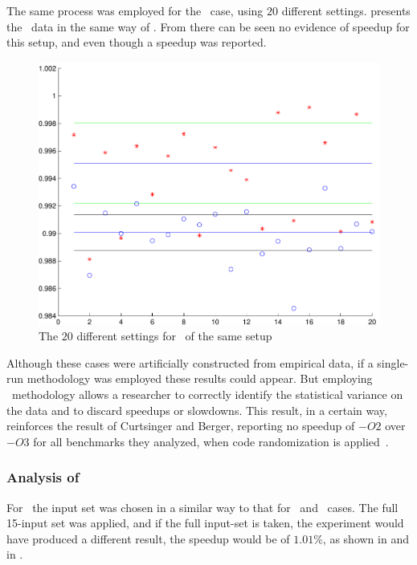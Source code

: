 The same process was employed for the \gzip\ case, using $20$ different settings.  presents the \gzip\ data in the same way of . From  there can be seen no evidence of speedup for this setup, and even though a speedup was reported.

\begin{figure}
  \centering
  \includegraphics[width=1.00\linewidth]{Figures/gzipfdll}
  \caption{The $20$ different settings for \gzip\ of the same setup}
  \label{fig:gzipfdll}
\end{figure}

Although these cases were artificially constructed from empirical data, if a single-run methodology was employed these results could appear. But employing \CP\ methodology allows a researcher to correctly identify the statistical variance on the data and to discard speedups or slowdowns. This result, in a certain way, reinforces the result of Curtsinger and Berger, reporting no speedup of $-O2$ over $-O3$ for all benchmarks they analyzed, when code randomization is applied~\cite{Curtsinger2013}.


\subsubsection{Analysis of \gobmk}

For \gobmk\ the input set was chosen in a similar way to that for \bzip\ and \gzip\ cases. The full 15-input set was applied, and if the full input-set is taken, the experiment would have produced a different result, the speedup would be of $1.01 \%$, as shown in  and in .

